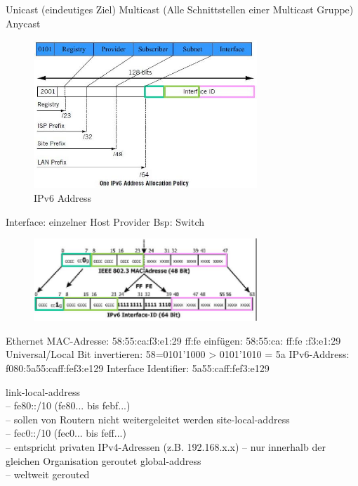 \documentclass[ngerman,a4paper,12pt]{scrreprt}
\begin{document}
\ul
	\li Unicast (eindeutiges Ziel)
	\li Multicast (Alle Schnittstellen einer Multicast Gruppe)
	\li Anycast
\ulE

\begin{figure}[H]
	\centering
	\includegraphics[width=0.75\textwidth]{img/V10.2.jpg}
	\caption{IPv6 Address}
	\label{}
\end{figure}

\ul
	\li Interface: einzelner Host
	\li Provider Bsp: Switch
\ulE

\begin{figure}[H]
	\centering
	\includegraphics[width=0.75\textwidth]{img/V10.3.jpg}
	\caption{}
	\label{}
\end{figure}

\ol
	\li Ethernet MAC-Adresse: 58:55:ca:f3:e1:29 ff:fe einfügen: 58:55:ca: ff:fe :f3:e1:29
	\li Universal/Local Bit invertieren: 58=0101’1000 > 0101’1010 = 5a
	\li IPv6-Address: f080:5a55:caff:fef3:e129%
	\li Interface Identifier: 5a55:caff:fef3:e129
\olE

\ul
	\li  link-local-address\\
– fe80::/10 (fe80... bis febf...)\\
– sollen von Routern nicht weitergeleitet werden
	\li site-local-address\\
– fec0::/10 (fec0... bis feff...)\\
– entspricht privaten IPv4-Adressen (z.B.
192.168.x.x)
– nur innerhalb der gleichen Organisation geroutet
	\li global-address\\
– weltweit gerouted
\end{document}
